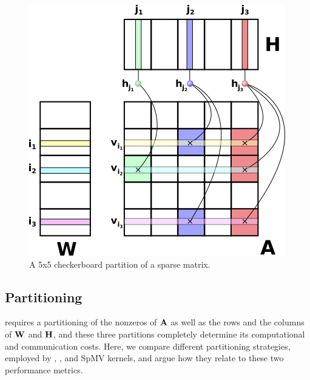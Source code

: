 \begin{figure}
\caption{A 5x5 checkerboard partition of a sparse matrix.}
\label{fig:partition}
\includegraphics[width=0.8\linewidth]{figures/matrix-partition.png}
\end{figure}

\subsection{Partitioning}

%

 requires a partitioning of the nonzeros of $\mathbf{A}$ as well as the rows and the columns of $\mathbf{W}$ and $\mathbf{H}$, and these three partitions completely determine its computational and communication costs.
Here, we compare different partitioning strategies, employed by \mpifaun, \hypertensor, and SpMV kernels, and argue how they relate to these two performance metrics.

